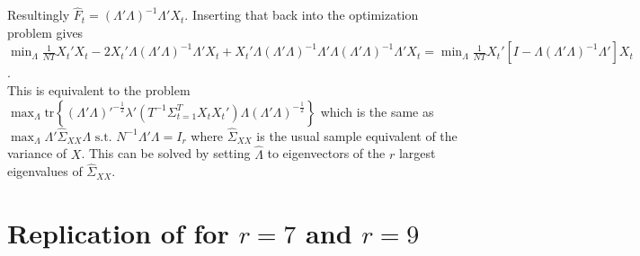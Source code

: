 \documentclass[11pt]{article}
\begin{document}
Resultingly $\hat F_t = (\Lambda' \Lambda)^{-1} \Lambda' X_t$. Inserting that back into the optimization problem gives $\min_\Lambda \frac{1}{NT} X_t'X_t - 2X_t' \Lambda (\Lambda' \Lambda)^{-1} \Lambda'X_t + X_t' \Lambda (\Lambda' \Lambda)^{-1} \Lambda' \Lambda (\Lambda' \Lambda)^{-1} \Lambda'X_t = \min_\Lambda \frac{1}{NT} X_t' [I - \Lambda (\Lambda' \Lambda)^{-1} \Lambda']X_t$. \\
This is equivalent to the problem $\max_\Lambda \text{tr}\left\{(\Lambda'\Lambda)'^{-\frac{1}{2}}\lambda'(T^{-1} \Sigma_{t=1}^T X_tX_t') \Lambda (\Lambda' \Lambda)^{-\frac{1}{2}}\right\}$ which is the same as $\max_\Lambda \Lambda' \hat \Sigma_{XX} \Lambda \text{ s.t. } N^{-1} \Lambda' \Lambda = I_r$ where $\hat \Sigma_{XX}$ is the usual sample equivalent of the variance of $X$. This can be solved by setting $\hat \Lambda$ to eigenvectors of the $r$ largest eigenvalues of $\hat \Sigma_{XX}$.


\newpage
\section{Replication of \citet{bai2002determining} for $r=7$ and $r=9$}
\end{document}
